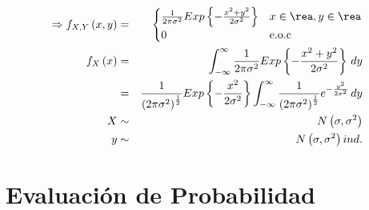 \begin{enumerate}
\begin{enumerate}
\begin{eqnarray*}
  \Rightarrow f_{X,Y} \left( x,y \right) &=& \begin{cases}
  \frac{1}{2\pi \sigma^2 } Exp \left\{ - \frac{x^2+y^2}{2\sigma^ 2} \right\} & x\in \rea, y \in \rea\\
  0 & \textrm{e.o.c}
  \end{cases}\\
  f_{X} \left(x \right) &=& \int_{-\infty}^{\infty} \frac{1}{2\pi \sigma^2} Exp \left\{ - \frac{x^2+y^2}{2\sigma^ 2} \right\} \,dy\\
  &=&  \frac{1}{\left(2\pi \sigma^2 \right)^{ \frac{1}{2} } }  Exp \left\{ - \frac{x^2}{2\sigma^ 2}\right\} \int_{- \infty}^{\infty} \frac{1}{  \left( 2\pi \sigma^2 \right)^{ \frac{1}{2} } } e^{- \frac{y^2}{2\sigma^2} } \, dy\\
  X &\sim& N \left( \sigma, \sigma^2\right)\\
  y &\sim& N \left( \sigma, \sigma^2 \right) ind.
\end{eqnarray*}
\end{enumerate}
\end{enumerate}

\section{ Evaluaci\'on de Probabilidad }


